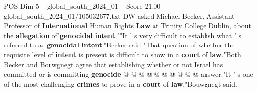 \begin{textsample}{POS Dim 5 – global\_south\_2024\_01 – Score 21.00 – global\_south\_2024\_01/105032677.txt}
DW asked Michael Becker, Assistant Professor of \textbf{International} Human Rights \textbf{Law} at Trinity College Dublin, about the \textbf{allegation} of"\textbf{genocidal} \textbf{intent}.""It ' s very difficult to establish what ' s referred to as \textbf{genocidal} \textbf{intent},"Becker said."That question of whether the requisite level of \textbf{intent} is present is difficult to show in a \textbf{court} of \textbf{law}."Both Becker and Bouwgnegt agree that establishing whether or not Israel has committed or is committing \textbf{genocide} @ @ @ @ @ @ @ @ @ @ answer."It ' s one of the most challenging \textbf{crimes} to prove in a \textbf{court} of \textbf{law},"Bouwgnegt said.

\end{textsample}
